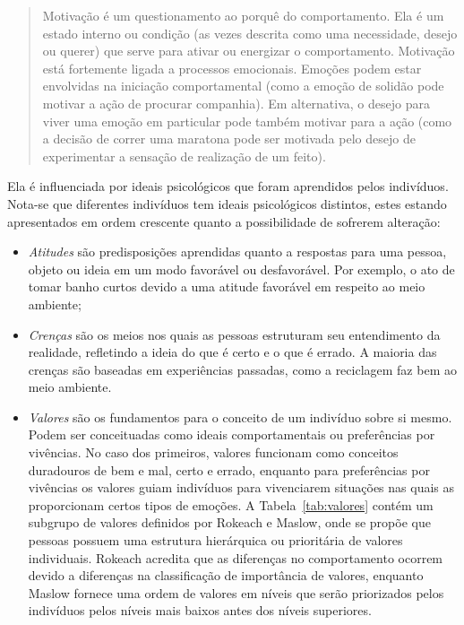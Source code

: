 \begin{quote}
Motivação é um questionamento ao porquê do comportamento. Ela é um estado
interno ou condição (as vezes descrita como uma necessidade, desejo ou querer)
que serve para ativar ou energizar o comportamento. Motivação está fortemente
ligada a processos emocionais. Emoções podem estar envolvidas na iniciação
comportamental (como a emoção de solidão pode motivar a ação de procurar
companhia). Em alternativa, o desejo para viver uma emoção em particular pode
também motivar para a ação (como a decisão de correr uma maratona pode ser
motivada pelo desejo de experimentar a sensação de realização de um feito).
\end{quote}

Ela é influenciada por ideais psicológicos que foram aprendidos pelos
indivíduos. Nota-se que diferentes indivíduos tem ideais psicológicos distintos,
estes estando apresentados em ordem crescente quanto a possibilidade de
sofrerem alteração:

\begin{itemize}
\item \emph{Atitudes} são predisposições aprendidas quanto a respostas
para uma pessoa, objeto ou ideia em um modo favorável ou desfavorável. Por
exemplo, o ato de tomar banho curtos devido a uma atitude favorável em respeito
ao meio ambiente;
\item \emph{Crenças} são os meios nos quais as pessoas estruturam seu
entendimento da realidade, refletindo a ideia do que é certo e o que é errado.
A maioria das crenças são baseadas em experiências passadas, como a reciclagem
faz bem ao meio ambiente.
\item \emph{Valores} são os fundamentos para o conceito de um indivíduo sobre si
mesmo. Podem ser conceituadas como ideais comportamentais ou preferências por
vivências. No caso dos primeiros, valores funcionam como conceitos duradouros de
bem e mal, certo e errado, enquanto para preferências por vivências os valores
guiam indivíduos para vivenciarem situações nas quais as proporcionam certos
tipos de emoções. A Tabela~\ref{tab:valores} contém um subgrupo de valores
definidos por Rokeach e Maslow, onde se propõe que pessoas possuem
uma estrutura hierárquica ou prioritária de valores individuais. Rokeach
acredita que as diferenças no comportamento ocorrem devido a diferenças na
classificação de importância de valores, enquanto Maslow fornece uma ordem de
valores em níveis que serão priorizados pelos indivíduos pelos níveis mais
baixos antes dos níveis superiores.
\end{itemize}

